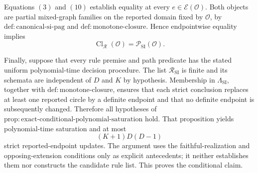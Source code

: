 Equations \((3)\) and \((10)\) establish equality at every \(e\in\mathcal E(\mathcal O)\).  Both objects are partial mixed-graph families on the reported domain fixed by \(\mathcal O\), by \(\mathrm{def:canonical\mbox{-}si\mbox{-}pag}\) and \(\mathrm{def:monotone\mbox{-}closure}\).  Hence endpointwise equality implies
\[
 \operatorname{Cl}_{\mathcal R}(\mathcal O)
 =\mathcal P_{\mathrm{SI}}(\mathcal O).
 \tag{11}
\]

Finally, suppose that every rule premise and path predicate has the stated uniform polynomial-time decision procedure.  The list \(\mathcal R_{\mathrm{SI}}\) is finite and its schemata are independent of \(D\) and \(K\) by hypothesis.  Membership in \(\Lambda_{\mathrm{SI}}\), together with \(\mathrm{def:monotone\mbox{-}closure}\), ensures that each strict conclusion replaces at least one reported circle by a definite endpoint and that no definite endpoint is subsequently changed.  Therefore all hypotheses of \(\mathrm{prop:exact\mbox{-}conditional\mbox{-}polynomial\mbox{-}saturation}\) hold.  That proposition yields polynomial-time saturation and at most
\[
 (K+1)D(D-1)
\]
strict reported-endpoint updates.  The argument uses the faithful-realization and opposing-extension conditions only as explicit antecedents; it neither establishes them nor constructs the candidate rule list.  This proves the conditional claim.

